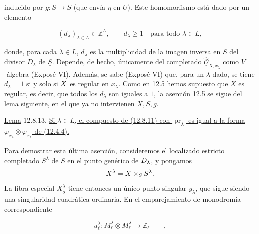 \begin{center}
\end{center}

\noindent
inducido por $g:S\longrightarrow\underline S$ (que envía $\eta$ en
$U$). Este homomorfismo está dado por un elemento


\begin{equation}\tag{12.8.12}
 (d_\lambda)_{\lambda\in L}\in\mathbb Z^L,\qquad
 d_\lambda\geqslant1\quad\text{para todo }\lambda\in L,
\end{equation}

\noindent
donde, para cada $\lambda\in L$, $d_\lambda$ es la multiplicidad de la
imagen inversa en $S$ del divisor $D_\lambda$ de $\underline S$. Depende,
de hecho, únicamente del completado
$\widehat{\underline{\mathcal O}}_{X,x_\lambda}$ como $V$-álgebra
(Exposé VI\sisi{\hspace{3em}}{}). Además, se sabe (Exposé
VI\sisi{\hspace{3em}}{}) que, para un $\lambda$ dado, se tiene
$d_\lambda=1$ si y solo si $\sisi{x}{X}$ es \underline{regular} en
$x_\lambda$. Como en 12.5 hemos supuesto que $X$ es regular, es decir,
que todos los $d_\lambda$ son iguales a $1$, la aserción 12.5 se sigue
del lema siguiente, en el que ya no intervienen $X,S,g$.

\medskip
\noindent
\underline{Lema} 12.8.13. \underline{Si $\lambda\in L$, el compuesto de
(12.8.11) con $\operatorname{pr}_\lambda$ es igual a la forma
$\varphi_{x_\lambda}\otimes\varphi_{x_\lambda}$ de (12.4.4).}

\medskip
Para demostrar esta última aserción, consideremos el localizado estricto
completado $\underline S^\lambda$ de $\underline S$ en el punto genérico
de $\sisi{D}{D_\lambda}$, y pongamos
\[
 \underline X^\lambda=
 \sisi{X}{\underline X}\times_{\sisi{S}{\underline S}}\underline S^\lambda.
\]
La fibra especial $\underline X_o^\lambda$ tiene entonces un único punto
singular $y_\lambda$, que sigue siendo una singularidad cuadrática
ordinaria. En el emparejamiento de monodromía correspondiente

\begin{equation}\tag{12.8.14}
 u_\ell^\lambda:M_\ell^\lambda\otimes M_\ell^\lambda
 \longrightarrow\mathbb Z_\ell\qquad ,
\end{equation}

